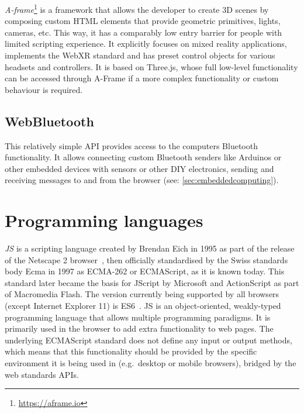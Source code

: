 \emph{A-frame}\footnote{\url{https://aframe.io}} is a framework that allows the developer to create \ac{3D} scenes by composing custom \ac{HTML} elements that provide geometric primitives, lights, cameras, etc.
This way, it has a comparably low entry barrier for people with limited scripting experience.
It explicitly focuses on mixed reality applications, implements the WebXR standard and has preset control objects for various headsets and controllers.
It is based on Three.js, whose full low-level functionality can be accessed through A-Frame if a more complex functionality or custom behaviour is required.

\subsection{WebBluetooth}

This relatively simple \ac{API} provides access to the computer\textquotesingle s Bluetooth functionality.
It allows connecting custom Bluetooth senders like Arduinos or other embedded devices with sensors or other \ac{DIY} electronics, sending and receiving messages to and from the browser (see: \autoref{sec:embeddedcomputing}).

\section{Programming languages}
\label{sec:programming-languages}



\emph{\ac{JS}} is a scripting language created by Brendan Eich in 1995 as part of the release of the Netscape 2 browser~\parencite{javascriptRelease}, then officially standardised by the Swiss standards body Ecma in 1997 as ECMA-262 or ECMAScript, as it is known today.
This standard later became the basis for JScript by Microsoft and ActionScript as part of Macromedia Flash.
The version currently being supported by all browsers (except Internet Explorer 11) is \ac{ES6}~\parencite{javascriptHistory}.
\ac{JS} is an object-oriented, weakly-typed programming language that allows multiple programming paradigms.
It is primarily used in the browser to add extra functionality to web pages.
The underlying ECMAScript standard does not define any input or output methods, which means that this functionality should be provided by the specific environment it is being used in (e.g.\ desktop or mobile browsers), bridged by the web standards \ac{API}s.

